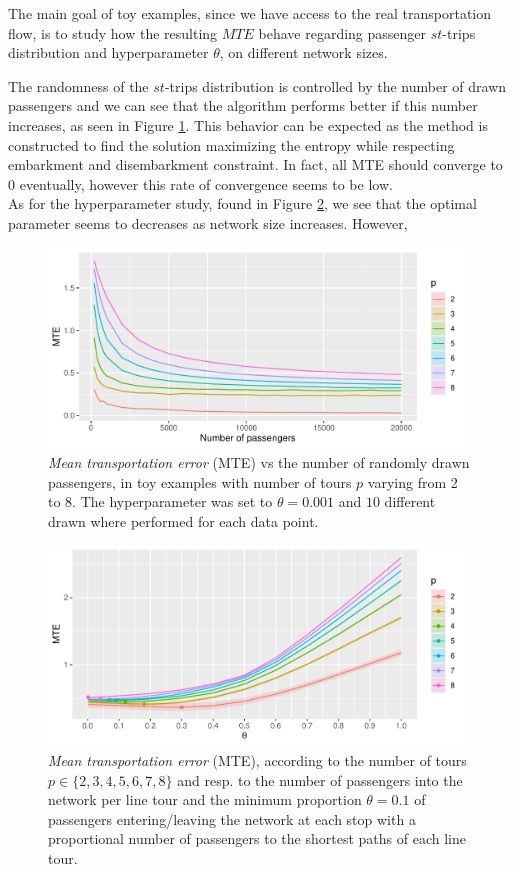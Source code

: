 \documentclass{bmcart}
\begin{document}
The main goal of toy examples, since we have access to the real transportation flow, is to study how the resulting $MTE$ behave regarding passenger $st$-trips distribution and hyperparameter $\theta$, on different network sizes. 

The randomness of the $st$-trips distribution is controlled by the number of drawn passengers and we can see that the algorithm performs better if this number increases, as seen in Figure \ref{MTE_vs_passengers}. This behavior can be expected as the method is constructed to find the solution maximizing the entropy while respecting embarkment and disembarkment constraint. In fact, all MTE should converge to $0$ eventually, however this rate of convergence seems to be low. \\
As for the hyperparameter study, found in Figure \ref{MTE_vs_theta}, we see that the optimal parameter seems to decreases as network size increases. However, 

\begin{figure}
	\includegraphics[width=0.98\textwidth]{fig/MTE_passengers_theta01.pdf}
	\caption{\emph{Mean transportation error} (MTE) vs the number of randomly drawn passengers, in toy examples with number of tours $p$ varying from 2 to 8. The hyperparameter was set to $\theta=0.001$ and $10$ different drawn where performed for each data point.}
	\label{MTE_vs_passengers}
\end{figure}

\begin{figure}
	\includegraphics[width=0.98\textwidth]{fig/MTE_tours.pdf}
	\caption{\emph{Mean transportation error} (MTE), according to the number of tours $p \in \{2,3,4,5,6,7,8\}$ and resp. to the number of passengers into the network per line tour and the minimum proportion $\theta =0.1$ of passengers entering/leaving the network at each stop with a proportional number of passengers to the shortest paths of each line tour.}
	\label{MTE_vs_theta}
\end{figure}
\end{document}
